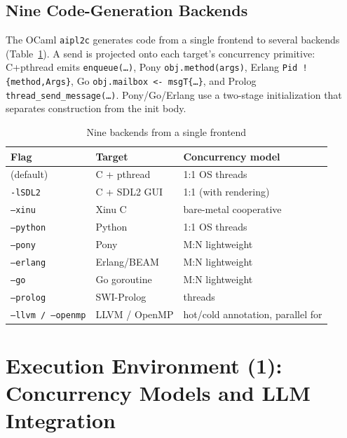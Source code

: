 \documentclass[11pt,a4paper]{article}
\newcommand{\code}[1]{\texttt{\small #1}}
\begin{document}
\subsection{Nine Code-Generation Backends}\label{sec:backends}
The OCaml \code{aipl2c} generates code from a single frontend to several
backends (Table~\ref{tab:backends}). A send is projected onto each
target's concurrency primitive: C+pthread emits \code{enqueue(\dots)},
Pony \code{obj.method(args)}, Erlang \code{Pid ! \{method,Args\}}, Go
\code{obj.mailbox <- msgT\{\dots\}}, and Prolog
\code{thread\_send\_message(\dots)}. Pony/Go/Erlang use a two-stage
initialization that separates construction from the init body.

\begin{table}[h]
\centering\small
\caption{Nine backends from a single frontend}\label{tab:backends}
\begin{tabularx}{\linewidth}{@{}l l X@{}}
\toprule
Flag & Target & Concurrency model \\
\midrule
(default) & C + pthread & 1:1 OS threads \\
\code{-lSDL2} & C + SDL2 GUI & 1:1 (with rendering) \\
\code{--xinu} & Xinu C & bare-metal cooperative \\
\code{--python} & Python & 1:1 OS threads \\
\code{--pony} & Pony & M:N lightweight \\
\code{--erlang} & Erlang/BEAM & M:N lightweight \\
\code{--go} & Go goroutine & M:N lightweight \\
\code{--prolog} & SWI-Prolog & threads \\
\code{--llvm / --openmp} & LLVM / OpenMP & hot/cold annotation, parallel for \\
\bottomrule
\end{tabularx}
\end{table}

\section{Execution Environment (1): Concurrency Models and LLM Integration}\label{sec:runtime}
\end{document}
